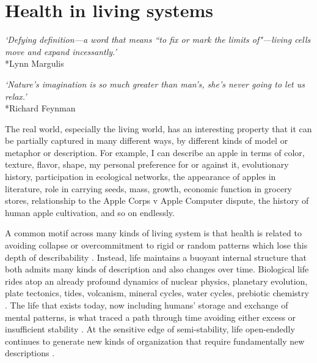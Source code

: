 \documentclass[12pt]{article}
\begin{document}
\section{Health in living systems}

\begin{center}
\textit{`Defying definition---a word that means ``to fix or mark the limits of"---living cells move and expand incessantly.'}\\*Lynn Margulis
\end{center}

\begin{center}
\textit{`Nature's imagination is so much greater than man's, she's never going to let us relax.'}\\*Richard Feynman
\end{center}

The real world, especially the living world, has an interesting property that it can be partially captured in many different ways, by different kinds of model or metaphor or description. For example, I can describe an apple in terms of color, texture, flavor, shape, my personal preference for or against it, evolutionary history, participation in ecological networks, the appearance of apples in literature, role in carrying seeds, mass, growth, economic function in grocery stores, relationship to the Apple Corps v Apple Computer dispute, the history of human apple cultivation, and so on endlessly.

A common motif across many kinds of living system is that health is related to avoiding collapse or overcommitment to rigid or random patterns which lose this depth of describability \citep{canguilhem1966normal, mackey1977oscillation, yachi1999biodiversity, deco2012ongoing, langton1990computation, gell1994quark, crutchfield1994calculi}. Instead, life maintains a buoyant internal structure that both admits many kinds of description and also changes over time. Biological life rides atop an already profound dynamics of nuclear physics, planetary evolution, plate tectonics, tides, volcanism, mineral cycles, water cycles, prebiotic chemistry \citep{smith2016origin, hazen2010mineral, stern2024importance, nisbet2001habitat, sleep2010hadean, baross1985submarine, wachtershauser1988before, martin2008hydrothermal, frank2024find, bregman2020humankind, virgo2011elongation, nowak2008prevolutionary}. The life that exists today, now including humans' storage and exchange of mental patterns, is what traced a path through time avoiding either excess or insufficient stability \citep{schrodinger1944what, bak2013nature, prigogine1984order, kirchhoff2018markov, langton1990computation, gell1994quark, crutchfield1994calculi}. At the sensitive edge of semi-stability, life open-endedly continues to generate new kinds of organization that require fundamentally new descriptions \citep{kauffman1992origins, stanley2017open, walker2004resilience, von1950theory,holling1973resilience, goldenfeld2011life}. 
\end{document}
